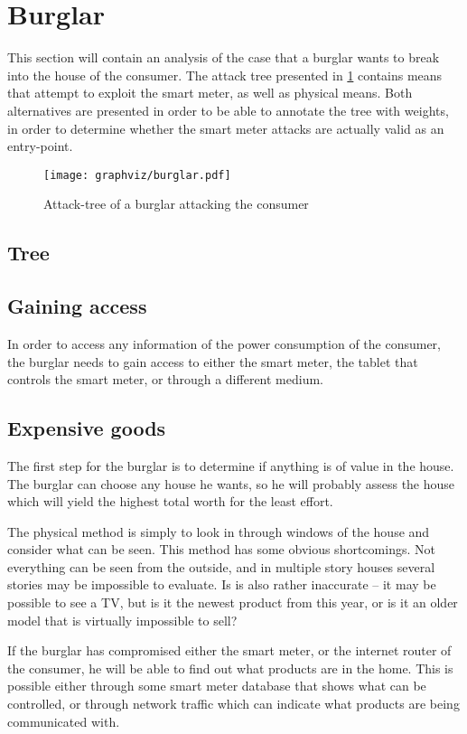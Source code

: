 \section{Burglar}
This section will contain an analysis of the case that a burglar wants to break into the house of the consumer.
The attack tree presented in \cref{attacktree:burglar} contains means that attempt to exploit the smart meter, as well as physical means.
Both alternatives are presented in order to be able to annotate the tree with weights, in order to determine whether the smart meter attacks are actually valid as an entry-point.

\begin{figure}
\texttt{[image: graphviz/burglar.pdf]}
\caption{Attack-tree of a burglar attacking the consumer}
\label{attacktree:burglar}
\end{figure}

\subsection{Tree}

\subsection{Gaining access}
In order to access any information of the power consumption of the consumer, the burglar needs to gain access to either the smart meter, the tablet that controls the smart meter, or through a different medium.

\subsection{Expensive goods}
The first step for the burglar is to determine if anything is of value in the house. 
The burglar can choose any house he wants, so he will probably assess the house which will yield the highest total worth for the least effort.

The physical method is simply to look in through windows of the house and consider what can be seen. 
This method has some obvious shortcomings.
Not everything can be seen from the outside, and in multiple story houses several stories may be impossible to evaluate.
Is is also rather inaccurate -- it may be possible to see a TV, but is it the newest product from this year, or is it an older model that is virtually impossible to sell?

If the burglar has compromised either the smart meter, or the internet router of the consumer, he will be able to find out what products are in the home. 
This is possible either through some smart meter database that shows what can be controlled, or through network traffic which can indicate what products are being communicated with.

